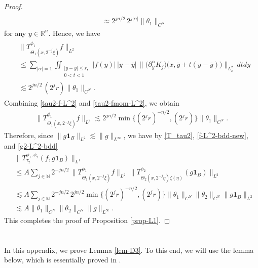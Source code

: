 \documentclass[12pt]{amsart}
\numberwithin{equation}{section}
\theoremstyle{plain}
\theoremstyle{definition}
\newcommand{\ichi}{\mathbf{1}}
\newcommand{\N}{\mathbb{N}}
\newcommand{\R}{\mathbb{R}}
\begin{document}
\begin{proof}
\begin{align*}
\\&\approx
2^{j n/2} \, 2^{j|\alpha|}
\| \theta_1 \|_{ C^N } 
\end{align*}
for any $y\in\R^n$.
Hence, we have
\begin{align} \label{tau2-fmom-L^2}
\begin{split}&
\| T^{\phi_1}_{ \Theta_1 (x, 2^{-j} \xi) } f \|_{L^2} 
\\&\le
\sum_{|\alpha|=1}
\iint_{ \substack{ |y-\bar{y}|\le r, \\ 0<t<1} }
|f(y)| \, |y-\bar{y}| \,
\Big\| \big( \partial_{y}^{\alpha} K_j \big) 
\big(x, \bar{y}+t(y-\bar{y}) \big) \Big\|_{L^2_{x}}
\,dt dy
\\&\lesssim
2^{j n/2} \, (2^{j} r)
\| \theta_1 \|_{ C^N } .
\end{split}
\end{align}
Combining \eqref{tau2-f-L^2} and \eqref{tau2-fmom-L^2},
we obtain
\begin{align} \label{f-L^2-bdd-new}
\| T^{\phi_1}_{ \Theta_1 (x, 2^{-j} \xi) } f \|_{L^2} 
\lesssim
2^{j n/2} 
\min\{ (2^{j} r)^{-n/2}, (2^{j} r) \}
\| \theta_1 \|_{ C^N } .
\end{align}
Therefore,
since $\| g\ichi_{B} \|_{L^{2}} \lesssim \|g\|_{L^{\infty}}$, 
we have by 
\eqref{T_tau2}, 
\eqref{f-L^2-bdd-new}, and 
\eqref{g2-L^2-bdd}
\begin{align*}&
\| T_{ \tau_2 }^{\phi_1, \phi_2} (f, g\ichi_{B}) \|_{L^1}
\\&\le A
\sum_{j \in \N } 
2^{-j n/2} \,
\| T^{\phi_1}_{ \Theta_1 (x, 2^{-j} \xi) } f \|_{L^2} \,
\| T^{\phi_2}_{ \Theta_2 (x, 2^{-j} \eta) \zeta(\eta) } (g\ichi_{B}) \|_{L^{2}} 
\\&\lesssim A
\sum_{j \in \N } 
2^{-j n/2} \, 2^{j n/2} 
\min\{ (2^{j} r)^{-n/2}, (2^{j} r) \}
\| \theta_1 \|_{ C^N }
\| \theta_2 \|_{ C^N } \|g\ichi_{B}\|_{L^2}
\\&\lesssim A
\| \theta_1 \|_{ C^N } \| \theta_2 \|_{ C^N } 
\|g\|_{L^\infty} .
\end{align*}
This completes the proof of Proposition \ref{prop-L1}.
\end{proof}


\appendix\section{}\label{sectionappendix}
\label{app}


In this appendix, we prove Lemma \ref{lem-D3}.
To this end, we will use the lemma below, 
which is essentially proved in \cite[Lemma 4.3]{KMT}.
\end{document}
